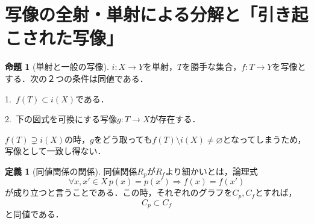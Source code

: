 \documentclass[uplatex, 12pt, dvipdfmx]{jsreport}
\theoremstyle{definition}
\newtheorem{proposition}[theorem]{命題}
\newtheorem{definition}[theorem]{定義}
\theoremstyle{StatementsWithStar}
\theoremstyle{StatementsWithStar2}
\theoremstyle{StatementsWithStar3}
\theoremstyle{StatementsWithCCirc}
\theoremstyle{definition}
\begin{document}
\section{写像の全射・単射による分解と「引き起こされた写像」}

\begin{proposition}[単射と一般の写像]\rm{}
    $i:X\to Y$を単射，$T$を勝手な集合，$f:T\to Y$を写像とする．次の２つの条件は同値である．
    
    1.\, $f(T)\subset i(X)$である．

    2.\, 下の図式を可換にする写像$g:T\to X$が存在する．
    \begin{center}\end{center}
\end{proposition}
$f(T)\supsetneq i(X)$の時，$g$をどう取っても$f(T)\setminus i(X)\ne\varnothing$となってしまうため，写像として一致し得ない．

\begin{definition}[同値関係の関係]\label{def-relationship-between-equivalence-relation}
    同値関係$R_p$が$R_f$より細かいとは，論理式
    \[ \forall x,x'\in X \, p(x)=p(x')\Rightarrow f(x)=f(x') \]
    が成り立つと言うことである．この時，それぞれのグラフを$C_p, C_f$とすれば，
    \[ C_p \subset C_f \]
    と同値である．
\end{definition}
\end{document}
